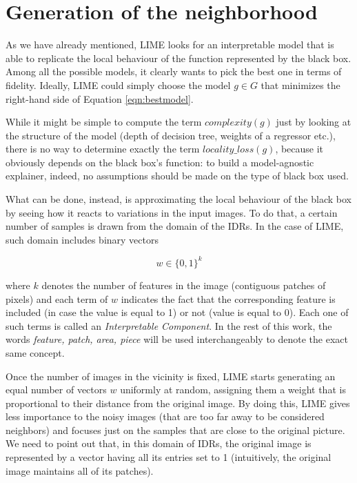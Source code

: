 \documentclass[12pt, twoside, a4paper]{report}
\begin{document}
\section{Generation of the neighborhood}

As we have already mentioned, LIME looks for an interpretable model that is able to replicate the local behaviour of the function represented by the black box. Among all the possible models, it clearly wants to pick the best one in terms of fidelity. Ideally, LIME could simply choose the model $g \in G$ that minimizes the right-hand side of Equation \ref{eqn:bestmodel}. 

While it might be simple to compute the term $complexity(g)$ just by looking at the structure of the model (depth of decision tree, weights of a regressor etc.), there is no way to determine exactly the term $locality\_loss(g)$, because it obviously depends on the black box's function: to build a model-agnostic explainer, indeed, no assumptions should be made on the type of black box used. 

What can be done, instead, is approximating the local behaviour of the black box by seeing how it reacts to variations in the input images. To do that, a certain number of samples is drawn from the domain of the IDRs. In the case of LIME, such domain includes binary vectors

\[
	w \in \{0,1\}^k
\]

where $k$ denotes the number of features in the image (contiguous patches of pixels) and each term of $w$ indicates the fact that the corresponding feature is included (in case the value is equal to 1) or not (value is equal to 0). Each one of such terms is called an \textit{Interpretable Component}. 
In the rest of this work, the words \textit{feature, patch, area, piece} will be used interchangeably to denote the exact same concept.

Once the number of images in the vicinity is fixed, LIME starts generating an equal number of vectors $w$ uniformly at random, assigning them a weight that is proportional to their distance from the original image. By doing this, LIME gives less importance to the noisy images (that are too far away to be considered neighbors) and focuses just on the samples that are close to the original picture.
We need to point out that, in this domain of IDRs, the original image is represented by a vector having all its entries set to 1 (intuitively, the original image maintains all of its patches).
\end{document}
